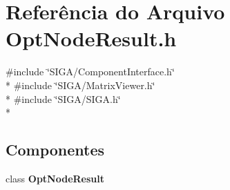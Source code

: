 \section{Referência do Arquivo Opt\+Node\+Result.\+h}
\label{_opt_node_result_8h}
{\ttfamily \#include \char`\"{}S\+I\+G\+A/\+Component\+Interface.\+h\char`\"{}}\\*
{\ttfamily \#include \char`\"{}S\+I\+G\+A/\+Matrix\+Viewer.\+h\char`\"{}}\\*
{\ttfamily \#include \char`\"{}S\+I\+G\+A/\+S\+I\+G\+A.\+h\char`\"{}}\\*
\subsection*{Componentes}
\begin{DoxyCompactItemize}
\item 
class {\bf Opt\+Node\+Result}
\end{DoxyCompactItemize}
